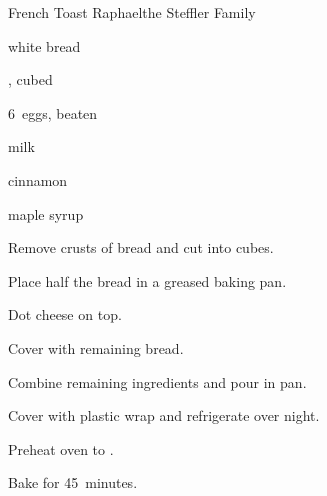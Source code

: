 \begin{recipe}{French Toast Raphael}{the Steffler Family}{}

\begin{ingredients}
\item {} white bread
\item {} , cubed 
\item 6~eggs, beaten
\item {} milk
\item \tp{\half} cinnamon
\item \C{\third} maple syrup
\end{ingredients}

\begin{directions}
\item Remove crusts of bread and cut into  cubes.
\item Place half the bread in a greased  baking pan.
\item Dot cheese on top.
\item Cover with remaining bread.
\item Combine remaining ingredients and pour in pan.
\item Cover with plastic wrap and refrigerate over night.
\item Preheat oven to .
\item Bake for 45~minutes.
\end{directions}
\end{recipe}
